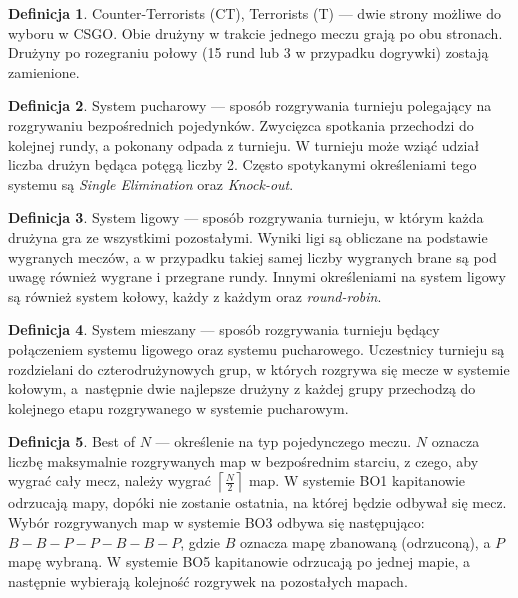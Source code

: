 \documentclass[shortabstract]{iithesis}
\theoremstyle{definition} \newtheorem{definition}{Definicja}[]
\theoremstyle{remark} \newtheorem{remark}[definition]{Observation}
\theoremstyle{plain} \newtheorem{theorem}[definition]{Theorem}
\theoremstyle{plain} \newtheorem{lemma}[definition]{Lemma}
\begin{document}
\begin{definition}
    Counter-Terrorists (CT), Terrorists (T) --- dwie strony możliwe do wyboru w CSGO. Obie drużyny w trakcie jednego meczu grają po obu stronach. Drużyny po rozegraniu połowy (15 rund lub 3 w przypadku dogrywki) zostają zamienione.
\end{definition}

\begin{definition}
    System pucharowy --- sposób rozgrywania turnieju polegający na rozgrywaniu bezpośrednich pojedynków. Zwycięzca spotkania przechodzi do kolejnej rundy, a pokonany odpada z turnieju. W turnieju może wziąć udział liczba drużyn będąca potęgą liczby 2. Często spotykanymi określeniami tego systemu są \textit{Single Elimination} oraz \textit{Knock-out}.
\end{definition}

\begin{definition}
    System ligowy --- sposób rozgrywania turnieju, w którym każda drużyna gra ze wszystkimi pozostałymi. Wyniki ligi są obliczane na podstawie wygranych meczów, a w przypadku takiej samej liczby wygranych brane są pod uwagę również wygrane i przegrane rundy. Innymi określeniami na system ligowy są również system kołowy, każdy z każdym oraz \textit{round-robin}.
\end{definition}

\begin{definition}
    System mieszany --- sposób rozgrywania turnieju będący połączeniem systemu ligowego oraz systemu pucharowego. Uczestnicy turnieju są rozdzielani do czterodrużynowych grup, w których rozgrywa się mecze w systemie kołowym, a~następnie dwie najlepsze drużyny z każdej grupy przechodzą do kolejnego etapu rozgrywanego w systemie pucharowym.
\end{definition}

\begin{definition}
    Best of $N$ --- określenie na typ pojedynczego meczu. $N$ oznacza liczbę maksymalnie rozgrywanych map w bezpośrednim starciu, z czego, aby wygrać cały mecz, należy wygrać $\left\lceil \frac{N}{2} \right\rceil$ map. W systemie BO1 kapitanowie odrzucają mapy, dopóki nie zostanie ostatnia, na której będzie odbywał się mecz. Wybór rozgrywanych map w systemie BO3 odbywa się następująco: $B - B - P - P - B - B - P$, gdzie $B$ oznacza mapę zbanowaną (odrzuconą), a $P$ mapę wybraną. W systemie BO5 kapitanowie odrzucają po jednej mapie, a następnie wybierają kolejność rozgrywek na pozostałych mapach.
\end{definition}
\end{document}
